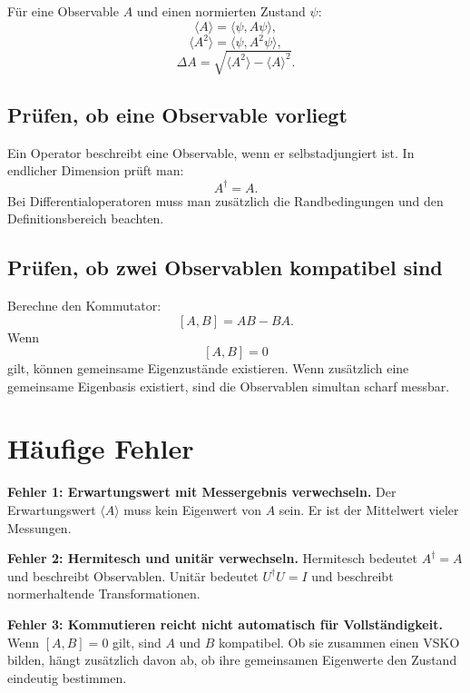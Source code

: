 Für eine Observable $A$ und einen normierten Zustand $\psi$:
\[
    \langle A\rangle=\langle\psi,A\psi\rangle,
\]
\[
    \langle A^2\rangle=\langle\psi,A^2\psi\rangle,
\]
\[
    \Delta A=\sqrt{\langle A^2\rangle-\langle A\rangle^2}.
\]

\subsection{Prüfen, ob eine Observable vorliegt}

Ein Operator beschreibt eine Observable, wenn er selbstadjungiert ist. In endlicher Dimension prüft man:
\[
    A^\dagger=A.
\]
Bei Differentialoperatoren muss man zusätzlich die Randbedingungen und den Definitionsbereich beachten.

\subsection{Prüfen, ob zwei Observablen kompatibel sind}

Berechne den Kommutator:
\[
    [A,B]=AB-BA.
\]
Wenn
\[
    [A,B]=0
\]
gilt, können gemeinsame Eigenzustände existieren. Wenn zusätzlich eine gemeinsame Eigenbasis existiert, sind die Observablen simultan scharf messbar.

\section{Häufige Fehler}

\begin{notebox}
\textbf{Fehler 1: Erwartungswert mit Messergebnis verwechseln.}
Der Erwartungswert $\langle A\rangle$ muss kein Eigenwert von $A$ sein. Er ist der Mittelwert vieler Messungen.
\end{notebox}

\begin{notebox}
\textbf{Fehler 2: Hermitesch und unitär verwechseln.}
Hermitesch bedeutet $A^\dagger=A$ und beschreibt Observablen. Unitär bedeutet $U^\dagger U=I$ und beschreibt normerhaltende Transformationen.
\end{notebox}

\begin{notebox}
\textbf{Fehler 3: Kommutieren reicht nicht automatisch für Vollständigkeit.}
Wenn $[A,B]=0$ gilt, sind $A$ und $B$ kompatibel. Ob sie zusammen einen VSKO bilden, hängt zusätzlich davon ab, ob ihre gemeinsamen Eigenwerte den Zustand eindeutig bestimmen.
\end{notebox}

